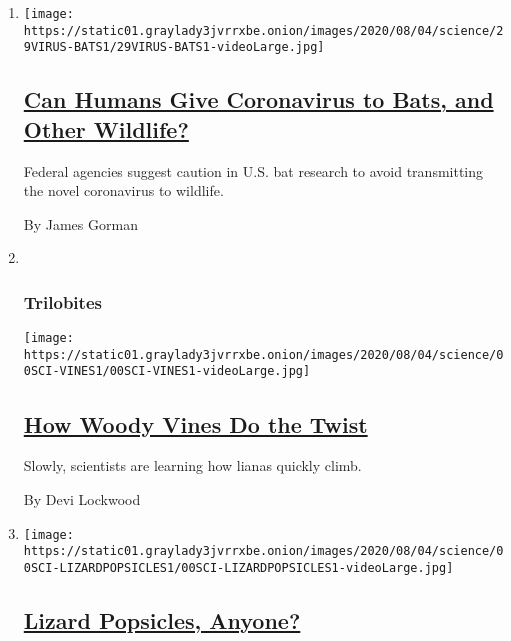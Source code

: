 \begin{enumerate}
\def\labelenumi{\arabic{enumi}.}
\item
  \texttt{[image: https://static01.graylady3jvrrxbe.onion/images/2020/08/04/science/29VIRUS-BATS1/29VIRUS-BATS1-videoLarge.jpg]}

  \hypertarget{can-humans-give-coronavirus-to-bats-and-other-wildlife}{%
  \subsection{\texorpdfstring{\href{/2020/08/01/science/Covid-bats.html}{Can
  Humans Give Coronavirus to Bats, and Other
  Wildlife?}}{Can Humans Give Coronavirus to Bats, and Other Wildlife?}}\label{can-humans-give-coronavirus-to-bats-and-other-wildlife}}

  Federal agencies suggest caution in U.S. bat research to avoid
  transmitting the novel coronavirus to wildlife.

  By James Gorman
\item ~
  \hypertarget{trilobites-1}{%
  \subsubsection{Trilobites}\label{trilobites-1}}

  \texttt{[image: https://static01.graylady3jvrrxbe.onion/images/2020/08/04/science/00SCI-VINES1/00SCI-VINES1-videoLarge.jpg]}

  \hypertarget{how-woody-vines-do-the-twist}{%
  \subsection{\texorpdfstring{\href{/2020/08/01/science/vines-lianas-panama.html}{How
  Woody Vines Do the
  Twist}}{How Woody Vines Do the Twist}}\label{how-woody-vines-do-the-twist}}

  Slowly, scientists are learning how lianas quickly climb.

  By Devi Lockwood
\item
  \texttt{[image: https://static01.graylady3jvrrxbe.onion/images/2020/08/04/science/00SCI-LIZARDPOPSICLES1/00SCI-LIZARDPOPSICLES1-videoLarge.jpg]}

  \hypertarget{lizard-popsicles-anyone}{%
  \subsection{\texorpdfstring{\href{/2020/07/31/science/lizards-liolaemus-argentina.html}{Lizard
  Popsicles,
  Anyone?}}{Lizard Popsicles, Anyone?}}\label{lizard-popsicles-anyone}}


\end{enumerate}
